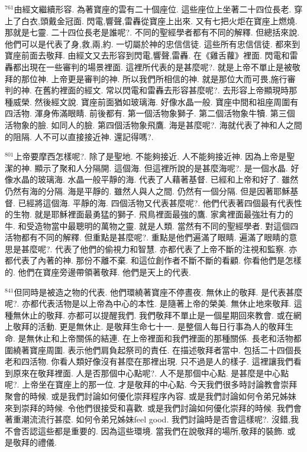 \documentclass{book}
\begin{document}
$^{761}$由經文繼續形容.
為著寶座的雲有二十個座位.
這些座位上坐著二十四位長老.
穿上了白衣,頭戴金冠面.
閃電,響聲,雷轟從寶座上出來.
又有七把火炬在寶座上燃燒.
那就是七靈.
二十四位長老是誰呢?.
不同的聖經學者都有不同的解釋.
但總括來說.
他們可以是代表了身,救,兩,約.
一切屬於神的忠信信徒.
這些所有忠信信徒.
都來到寶座前面去敬拜.
由經文又去形容到閃電,響聲,雷轟.
在《雞舌蘿》裡面.
閃電和雷轟都出現在一些審判的場景裡面.
這裡所代表的是甚麼呢?.
就是上帝不單止是被敬拜的那位神.
上帝更是審判的神.
所以我們所相信的神.
就是那位大而可畏,施行審判的神.
在舊約裡面的經文.
常以閃電和雷轟去形容甚麼呢?.
去形容上帝顯現時那種威榮.
然後經文說.
寶座前面猶如玻璃海.
好像水晶一般.
寶座中間和祖座周圍有四活物.
渾身佈滿眼睛.
前後都有.
第一個活物象獅子.
第二個活物象牛犢.
第三個活物象的臉.
如同人的臉.
第四個活物象飛鷹.
海是甚麼呢?.
海就代表了神和人之間的阻隔.
人不可以直接接近神.
還記得嗎?.

$^{801}$上帝要摩西怎樣呢?.
除了是聖地.
不能夠接近.
人不能夠接近神.
因為上帝是聖潔的神.
顯示了聚和人分隔開.
這個海.
但這裡所說的是甚麼海呢?.
是一個水晶.
好像水晶的玻璃海.
水晶一般平靜的海.
代表了人藉著基督.
已經和上帝和好了.
雖然仍然有海的分隔.
海是平靜的.
雖然人與人之間.
仍然有一個分隔.
但是因著耶穌基督.
已經將這個海.
平靜的海.
四個活物又代表甚麼呢?.
他們代表著四個最有代表性的生物.
就是耶穌裡面最勇猛的獅子.
飛鳥裡面最強的鷹.
家禽裡面最強壯有力的牛.
和受造物當中最聰明的萬物之靈.
就是人類.
當然有不同的聖經學者.
對這個四活物都有不同的解釋.
但重點是甚麼呢?.
重點是他們遍滿了眼睛.
遍滿了眼睛的意思是甚麼呢?.
代表了他們的偷視力和智慧.
亦都代表了上帝不斷的注視和監察.
亦都代表了內著的神.
那份不離不棄.
和這位創作者不斷不斷的看顧.
你看他們是怎樣的.
他們在寶座旁邊帶領著敬拜.
他們是天上的代表.

$^{841}$但同時是被造之物的代表.
他們環繞著寶座不停晝夜.
無休止的敬拜.
是代表甚麼呢?.
亦都代表活物是以上帝為中心的本性.
是隨著上帝的榮美.
無休止地來敬拜.
這種無休止的敬拜.
亦都可以提醒我們.
我們敬拜不單止是一個星期回來教會.
或在網上敬拜的活動.
更是無休止.
是敬拜生命七十一.
是整個人每日行事為人的敬拜生命.
是無休止和上帝關係的結連.
在上帝裡面和我們裡面的那種關係.
長老和活物都圍繞著寶座周圍.
表示他們肩負起祭司的責任.
在描述敬拜者當中.
包括二十四個長老和四活物.
你看人類好像沒有甚麼在那裡出現.
只不過是人的樣子.
這裡讓我們看到原來在敬拜裡面.
人是否那個中心點呢?.
人不是那個中心點.
是甚麼是中心點呢?.
上帝坐在寶座上的那一位.
才是敬拜的中心點.
今天我們很多時討論教會崇拜聚會的時候.
或是我們討論如何優化崇拜程序內容.
或是我們討論如何令弟兄姊妹來到崇拜的時候.
令他們很接受和喜歡.
或是我們討論如何優化崇拜的時候.
我們會著重潮流流行甚麼.
如何令弟兄姊妹feel good.
我們討論時是否會這樣呢?.
沒錯,我不會否認這些都是重要的.
因為這些環境.
當我們在說敬拜的場所,敬拜的裝飾.
或是敬拜的禮儀.
\end{document}
